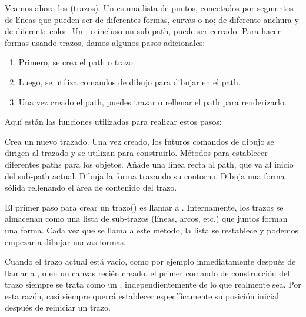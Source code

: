 Veamos ahora los (trazos). Un  es una lista de puntos, conectados por segmentos de líneas que pueden ser de diferentes formas, curvas o no; de diferente anchura y de diferente color. Un , o incluso un sub-path, puede ser cerrado. Para hacer formas usando trazos, damos algunos pasos adicionales:

\begin{enumerate}
	\item Primero, se crea el path o trazo.
	\item Luego, se utiliza comandos de dibujo para dibujar en el path.
	\item Una vez creado el path, puedes trazar o rellenar el path para renderizarlo.
\end{enumerate}

\vspace{0.5cm} %
Aquí están las funciones utilizadas para realizar estos pasos:

\begin{description}
	 Crea un nuevo trazado. Una vez creado, los futuros comandos de dibujo se dirigen al trazado y se utilizan para construirlo.
	 Métodos para establecer diferentes paths para los objetos.
	 Añade una línea recta al path, que va al inicio del sub-path actual.
	 Dibuja la forma trazando su contorno.
	 Dibuja una forma sólida rellenando el área de contenido del trazo.
\end{description}

\vspace{0.5cm} %
El primer paso para crear un trazo() es llamar a . Internamente, los trazos se almacenan como una lista de sub-trazos (líneas, arcos, etc.) que juntos forman una forma. Cada vez que se llama a este método, la lista se restablece y podemos empezar a dibujar nuevas formas.

\vspace{0.5cm} %
\begin{tcolorbox}
	[colback=red!5!white,colframe=cyan,fonttitle=\bfseries,title={\faLightbulbO\, Nota:}]

	Cuando el trazo actual está vacío, como por ejemplo inmediatamente después de llamar a , o en un canvas recién creado, el primer comando de construcción del trazo siempre se trata como un , independientemente de lo que realmente sea. Por esta razón, casi siempre querrá establecer específicamente su posición inicial después de reiniciar un trazo.
\end{tcolorbox}
\vspace{0.5cm} %

